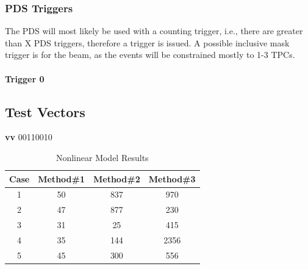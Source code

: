 \documentclass[]{report}
\begin{document}
\subsection{PDS Triggers}

The PDS will most likely be used with a counting trigger, i.e., there are greater than X PDS triggers, therefore a trigger is issued. A possible inclusive mask trigger is for the beam, as the events will be constrained mostly to 1-3 TPCs.

\subsubsection{Trigger 0}

\begin{appendices}
	\chapter{ Test Vectors}
	
	\begin{center}
		\textbf{vv} 00110010
		
		\begin{table}[ht]	
		\caption{Nonlinear Model Results}%
		\centering %
		\begin{tabular}{c c c c}	%
		\hline \hline                %
		Case & Method\#1 & Method\#2 & Method\#3 \\ [0.5ex] %
		\hline %
		1 & 50 & 837 & 970  \\	%
		2 & 47 & 877 & 230  \\
		3 & 31 & 25  & 415  \\
		4 & 35 & 144 & 2356 \\
		5 & 45 & 300 & 556 \\ [1ex]	%
		\hline	%
		\end{tabular}
		\label{table:nonlin}	%
		\end{table}
		
	\end{center}
\end{appendices}
	 	 
\end{document}
